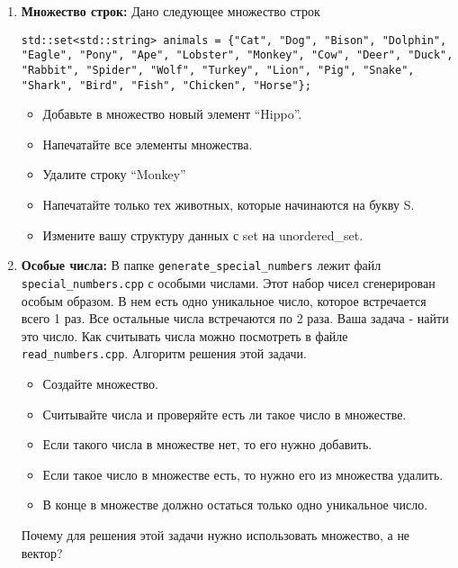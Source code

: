 \documentclass{article}
\begin{document}
\begin{enumerate}
\item \textbf{Множество строк:} Дано следующее множество строк
\begin{lstlisting}
std::set<std::string> animals = {"Cat", "Dog", "Bison", "Dolphin", "Eagle", "Pony", "Ape", "Lobster", "Monkey", "Cow", "Deer", "Duck", "Rabbit", "Spider", "Wolf", "Turkey", "Lion", "Pig", "Snake", "Shark", "Bird", "Fish", "Chicken", "Horse"};
\end{lstlisting}
\begin{itemize}
\item Добавьте в множество новый элемент ``Hippo''.
\item Напечатайте все элементы множества.
\item Удалите строку ``Monkey''
\item Напечатайте только тех животных, которые начинаются на букву S.
\item Измените вашу структуру данных с set на unordered\_set.
\end{itemize}


\item \textbf{Особые числа:} В папке \texttt{generate\_special\_numbers} лежит файл \texttt{special\_numbers.cpp} с особыми числами. Этот набор чисел сгенерирован особым образом. В нем есть одно уникальное число, которое встречается всего 1 раз. Все остальные числа встречаются по 2 раза. Ваша задача - найти это число. Как считывать числа можно посмотреть в файле \texttt{read\_numbers.cpp}. Алгоритм решения этой задачи.
\begin{itemize}
\item Создайте множество.
\item Считывайте числа и проверяйте есть ли такое число в множестве.
\item Если такого числа в множестве нет, то его нужно добавить.
\item Если такое число в множестве есть, то нужно его из множества удалить.
\item В конце в множестве должно остаться только одно уникальное число.
\end{itemize}
Почему для решения этой задачи нужно использовать множество, а не вектор?

\end{enumerate}
\end{document}
